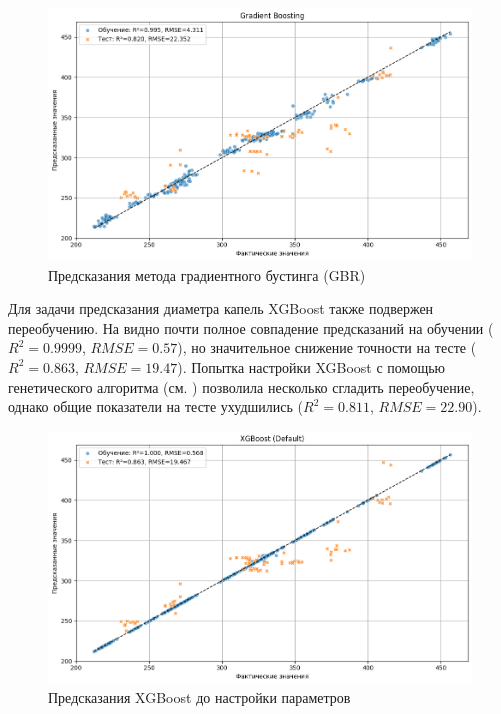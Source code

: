 \begin{figure}[htbp!]
	\centering
	\includegraphics[width=.9\linewidth]{my_folder/images/droplet_size/Gradient-Boosting.png}
	\caption{Предсказания метода градиентного бустинга (GBR)} 
	\label{fig:droplet-size-gbr}  
\end{figure}
\newpage

Для задачи предсказания диаметра капель XGBoost также подвержен переобучению. На  видно почти полное совпадение предсказаний на обучении ($R^2 = 0.9999$, $RMSE = 0.57$), но значительное снижение точности на тесте ($R^2 = 0.863$, $RMSE = 19.47$). Попытка настройки XGBoost с помощью генетического алгоритма (см. ) позволила несколько сгладить переобучение, однако общие показатели на тесте ухудшились ($R^2 = 0.811$, $RMSE = 22.90$).

\begin{figure}[htbp!]
	\centering
	\includegraphics[width=.9\linewidth]{my_folder/images/droplet_size/XGBoost-overfiting.png}
	\caption{Предсказания XGBoost до настройки параметров} 
	\label{fig:droplet-size-xgboost-overfit}  
\end{figure}

